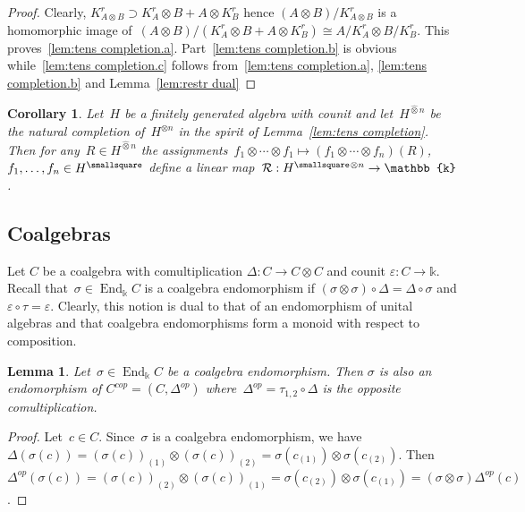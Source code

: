 \documentclass[12pt, reqno]{amsart}
\newcommand{\wh}[1]{\widehat{#1}}
\newtheorem{corollary}[theorem]{Corollary}
\newtheorem{lemma}[theorem]{Lemma}
\theoremstyle{definition}
\numberwithin{equation}{section}
\newcommand{\tensor}{\otimes}
\newcommand{\kk}{\mathbb{k}}\newcommand{\lie}[1]{{\mathfrak{#1}}}
\DeclareMathOperator{\End}{End}
\begin{document}
\begin{proof}
Clearly, $K_{A\tensor B}^r\supset K_A^r\tensor B+
A\tensor K_B^r$ hence $(A\tensor B)/K_{A\tensor B}^r$
is a homomorphic image of~$(A\tensor B)/(K_A^r\tensor B+A\tensor K_B^r)\cong A/K_A^r\tensor B/K_B^r$. This proves~\ref{lem:tens completion.a}. Part~\ref{lem:tens completion.b} is obvious while~\ref{lem:tens completion.c}
follows from~\ref{lem:tens completion.a}, \ref{lem:tens completion.b} and Lemma~\ref{lem:restr dual}
\end{proof}
\begin{corollary}\label{cor:complet tensor}
Let~$H$ be a finitely generated algebra with counit and
let~$H^{\wh\tensor n}$ be the natural completion of~$H^{\tensor n}$ in the spirit of Lemma~\ref{lem:tens completion}. Then for any~$R\in H^{\wh\tensor n}$
the assignments~$f_1\tensor\cdots\tensor f_1\mapsto 
(f_1\tensor\cdots\tensor f_n)(R)$,
$f_1,\dots,f_n\in H^{\smallsquare}$ define a 
linear map~$\mathcal R:H^{\smallsquare}{}^{\tensor n}\to \kk$.
\end{corollary}

\subsection{Coalgebras}
Let $C$ be a coalgebra with comultiplication $\Delta:C\to C\tensor C$ and counit $\varepsilon:C\to \kk$. 
Recall that~$\sigma\in\End_\kk C$ is 
a coalgebra endomorphism if 
$(\sigma\tensor \sigma)\circ\Delta=
\Delta\circ \sigma$ and $\varepsilon\circ \tau=\varepsilon$. 
Clearly, this notion is dual to that of
an endomorphism of unital algebras
and that coalgebra endomorphisms form
a monoid with respect to composition.
\begin{lemma}\label{lem:op coalg end}
Let~$\sigma\in\End_\kk C$ be a coalgebra endomorphism. Then
$\sigma$ is also an endomorphism of 
$C^{cop}=(C,\Delta^{op})$ where~$\Delta^{op}=\tau_{1,2}\circ\Delta$ is the opposite
comultiplication.
\end{lemma}
\begin{proof}
Let~$c\in C$. Since~$\sigma$ is a coalgebra endomorphism, we have $\Delta(\sigma(c))=(\sigma(c))_{(1)}\tensor(\sigma(c))_{(2)}=
\sigma(c_{(1)})\tensor\sigma(c_{(2)})$.
Then $\Delta^{op}(\sigma(c))=
(\sigma(c))_{(2)}\tensor(\sigma(c))_{(1)}
=\sigma(c_{(2)})\tensor\sigma(c_{(1)})
=(\sigma\tensor\sigma)\Delta^{op}(c)$.
\end{proof}
\end{document}
